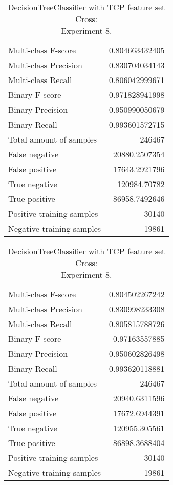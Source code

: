 \begin{table}[H]
\begin{minipage}{0.5\textwidth}
\caption{DecisionTreeClassifier with TCP feature set Cross: \\Experiment 7.}
\centering
\begin{tabular}{l r}
\toprule
Multi-class F-score & 0.804663432405 \\
Multi-class Precision & 0.830704034143 \\
Multi-class Recall & 0.806042999671 \\
\midrule
Binary F-score & 0.971828941998 \\
Binary Precision & 0.950990050679 \\
Binary Recall & 0.993601572715 \\
\midrule
Total amount of samples & 246467 \\
False negative & 20880.2507354 \\
False positive & 17643.2921796 \\
True negative & 120984.70782 \\
True positive & 86958.7492646 \\
\midrule
Positive training samples & 30140 \\
Negative training samples & 19861 \\
\bottomrule
\end{tabular}
\end{minipage}
\hfillx
\begin{minipage}{0.5\textwidth}
\caption{DecisionTreeClassifier with TCP feature set Cross: \\Experiment 8.}
\centering
\begin{tabular}{l r}
\toprule
Multi-class F-score & 0.804502267242 \\
Multi-class Precision & 0.830998233308 \\
Multi-class Recall & 0.805815788726 \\
\midrule
Binary F-score & 0.97163557885 \\
Binary Precision & 0.950602826498 \\
Binary Recall & 0.993620118881 \\
\midrule
Total amount of samples & 246467 \\
False negative & 20940.6311596 \\
False positive & 17672.6944391 \\
True negative & 120955.305561 \\
True positive & 86898.3688404 \\
\midrule
Positive training samples & 30140 \\
Negative training samples & 19861 \\
\bottomrule
\end{tabular}
\end{minipage}
\end{table}
